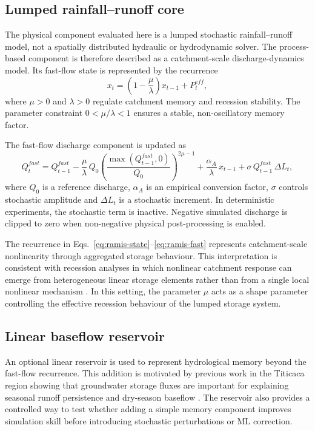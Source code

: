 \documentclass[a4paper,fleqn]{cas-sc}
\begin{document}
\subsection{Lumped rainfall--runoff core}\label{subsec:physical-core}

The physical component evaluated here is a lumped stochastic
rainfall--runoff model, not a spatially distributed hydraulic or
hydrodynamic solver. The process-based component is therefore described
as a catchment-scale discharge-dynamics model. Its fast-flow state is
represented by the recurrence
\begin{equation}
x_t = \left(1 - \frac{\mu}{\lambda}\right)x_{t-1} + P^{eff}_t,
\label{eq:ramis-state}
\end{equation}
where $\mu>0$ and $\lambda>0$ regulate catchment memory and recession
stability. The parameter constraint $0<\mu/\lambda<1$ ensures a stable,
non-oscillatory memory factor.

The fast-flow discharge component is updated as
\begin{equation}
Q^{fast}_t = Q^{fast}_{t-1}
  - \frac{\mu}{\lambda}\,Q_0
    \left(\frac{\max(Q^{fast}_{t-1},0)}{Q_0}\right)^{2\mu-1}
  + \frac{\alpha_A}{\lambda}\,x_{t-1}
  + \sigma\,Q^{fast}_{t-1}\,\Delta L_t,
\label{eq:ramis-fast}
\end{equation}
where $Q_0$ is a reference discharge, $\alpha_A$ is an empirical
conversion factor, $\sigma$ controls stochastic amplitude and
$\Delta L_t$ is a stochastic increment. In deterministic experiments,
the stochastic term is inactive. Negative simulated discharge is clipped
to zero when non-negative physical post-processing is enabled.

The recurrence in Eqs.~\ref{eq:ramis-state}--\ref{eq:ramis-fast}
represents catchment-scale nonlinearity through aggregated storage
behaviour. This interpretation is consistent with recession analyses in
which nonlinear catchment response can emerge from heterogeneous linear
storage elements rather than from a single local nonlinear mechanism
\citep{harman2009power}. In this setting, the parameter $\mu$ acts as a
shape parameter controlling the effective recession behaviour of the
lumped storage system.

\subsection{Linear baseflow reservoir}\label{subsec:baseflow}

An optional linear reservoir is used to represent hydrological memory
beyond the fast-flow recurrence. This addition is motivated by previous
work in the Titicaca region showing that groundwater storage fluxes are
important for explaining seasonal runoff persistence and dry-season
baseflow \citep{nauditt2017conceptual}. The reservoir also provides a
controlled way to test whether adding a simple memory component improves
simulation skill before introducing stochastic perturbations or ML
correction.
\end{document}
